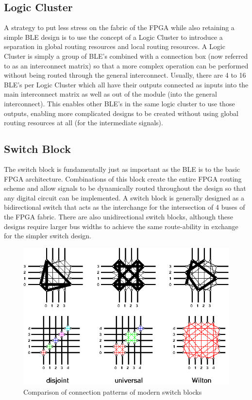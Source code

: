 \documentclass[12pt]{article}
\begin{document}
\subsection{Logic Cluster}
A strategy to put less stress on the fabric of the FPGA while also retaining a simple 
BLE design is to use the concept of a Logic Cluster to introduce a separation in 
global routing resources and local routing resources. A Logic Cluster is simply a 
group of BLE’s combined with a connection box (now referred to as an interconnect matrix)
so that a more complex operation 
can be performed without being routed through the general interconnect. Usually, 
there are 4 to 16 BLE’s per Logic Cluster which all have their outputs connected 
as inputs into the main interconnect matrix as well as out of the module (into the 
general interconnect). This enables other BLE’s in the same logic cluster to use 
those outputs, enabling more complicated designs to be created without using global 
routing resources at all (for the intermediate signals).

\subsection{Switch Block}
The switch block is fundamentally just as important as the BLE is to the basic FPGA 
architecture. Combinations of this block create the entire FPGA routing scheme and 
allow signals to be dynamically routed throughout the design so that any digital 
circuit can be implemented. A switch block is generally designed as a bidirectional 
switch that acts as the interchange for the intersection of 4 buses of the FPGA fabric.
There are also unidirectional switch blocks, although these designs require larger 
bus widths to achieve the same route-ability in exchange for the simpler switch design.

\begin{figure}[ht]
  \centering
  \includegraphics[width=.6\textwidth]{switch_blocks}
  \caption{Comparison of connection patterns of modern switch blocks \cite{switch_blocks}}
  \label{fig:switch_blocks}
\end{figure}
\end{document}
